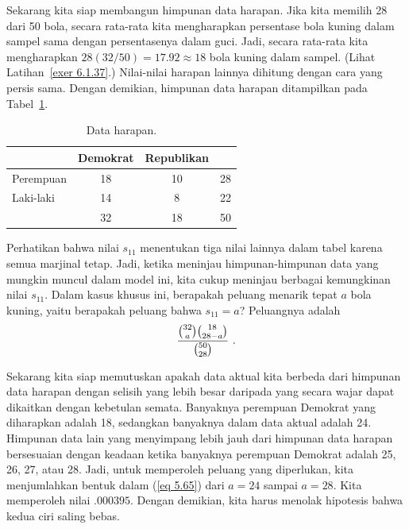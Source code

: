 \begin{example}
Sekarang kita siap membangun himpunan data harapan. Jika kita memilih 28 dari 50
bola, secara rata-rata kita mengharapkan persentase bola kuning dalam sampel sama
dengan persentasenya dalam guci. Jadi, secara rata-rata kita mengharapkan
$28(32/50) = 17.92 \approx 18$ bola kuning dalam sampel. (Lihat
Latihan~\ref{exer 6.1.37}.) Nilai-nilai harapan lainnya dihitung dengan cara yang
persis sama. Dengan demikian, himpunan data harapan ditampilkan pada
Tabel~\ref{table 5.4}.
\begin{table}
\centering
\begin{tabular}{|l|c|c|c|}
\hline
 & \hspace{.15in}Demokrat\hspace{.15in} & \hspace{.1in}Republikan \hspace{.1in} & \\ \hline 
\hspace{.1in}Perempuan & 18 & 10           & \hspace{.2in}28\hspace{.2in}\\ \hline 
\hspace{.1in}Laki-laki   & 14 & \hspace{.075in}8  & \hspace{.2in}22 \\ \hline
 & 32 & 18 & \hspace{.2in}50\\ \hline
\end{tabular}
\caption{Data harapan.}
\label{table 5.4}
\end{table}
Perhatikan bahwa nilai $s_{11}$ menentukan tiga nilai lainnya dalam tabel karena
semua marjinal tetap. Jadi, ketika meninjau himpunan-himpunan data yang mungkin muncul
dalam model ini, kita cukup meninjau berbagai kemungkinan nilai $s_{11}$. Dalam kasus
khusus ini, berapakah peluang menarik tepat $a$ bola kuning, yaitu berapakah peluang
bahwa $s_{11} = a$? Peluangnya adalah
\begin{equation}{{{{32}\choose{a}}{{18}\choose{28-a}}}\over{{{50}\choose{28}}}}\ .
\label{eq 5.65}
\end{equation}
\par Sekarang kita siap memutuskan apakah data aktual kita berbeda dari himpunan data
harapan dengan selisih yang lebih besar daripada yang secara wajar dapat dikaitkan
dengan kebetulan semata. Banyaknya perempuan Demokrat yang diharapkan adalah 18,
sedangkan banyaknya dalam data aktual adalah 24. Himpunan data lain yang menyimpang
lebih jauh dari himpunan data harapan bersesuaian dengan keadaan ketika
banyaknya perempuan Demokrat adalah 25, 26, 27, atau 28. Jadi, untuk memperoleh
peluang yang diperlukan, kita menjumlahkan bentuk dalam (\ref{eq 5.65}) dari
$a = 24$ sampai $a = 28$. Kita memperoleh nilai $.000395$. Dengan demikian, kita
harus menolak hipotesis bahwa kedua ciri saling bebas.
\end{example}
